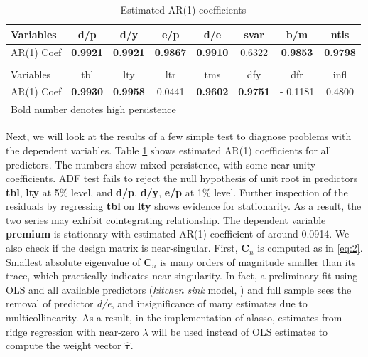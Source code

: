 \documentclass[12pt,a4paper]{article}
\begin{document}
\begin{table}[]\center \small
\caption{Estimated AR(1) coefficients}
\label{tab:4}
\begin{tabular}{lccccccc}
\hline
\multicolumn{1}{|l|}{Variables}  & d/p             & d/y             & e/p             & d/e             & svar   & b/m             & \multicolumn{1}{c|}{ntis}   \\ \hline
\multicolumn{1}{|l|}{AR(1) Coef} & \textbf{0.9921} & \textbf{0.9921} & \textbf{0.9867} & \textbf{0.9910} & 0.6322 & \textbf{0.9853} & \multicolumn{1}{c|}{\textbf{0.9798}} \\ \hline
\multicolumn{8}{l}{}                                                                                                                                              \\ \hline
\multicolumn{1}{|l|}{Variables}  & tbl             & lty             & ltr             & tms             & dfy    & dfr             & \multicolumn{1}{c|}{infl}   \\ \hline
\multicolumn{1}{|l|}{AR(1) Coef} & \textbf{0.9930} & \textbf{0.9958} & 0.0441          & \textbf{0.9602}          & \textbf{0.9751} & - 0.1181        & \multicolumn{1}{c|}{0.4800} \\ \hline
\multicolumn{8}{l}{Bold number denotes high persistence}                                                                                          
\end{tabular}
\end{table}

Next, we will look at the results of a few simple test to diagnose problems with the dependent variables. Table \ref{tab:4} shows estimated AR(1) coefficients for all predictors. The numbers show mixed persistence, with some near-unity coefficients. ADF test fails to reject the null hypothesis of unit root in predictors \textbf{tbl}, \textbf{lty} at 5\% level, and \textbf{d/p}, \textbf{d/y}, \textbf{e/p} at 1\% level. Further inspection of the residuals by regressing \textbf{tbl} on \textbf{lty} shows evidence for stationarity. As a result, the two series may exhibit cointegrating relationship. The dependent variable \textbf{premium} is stationary with estimated AR(1) coefficient of around 0.0914. We also check if the design matrix is near-singular. First, $ \bm{C}_n $ is computed as in \eqref{eq:2}. Smallest absolute eigenvalue of $ \bm{C}_n $ is many orders of magnitude smaller than its trace, which practically indicates near-singularity. In fact, a preliminary fit using OLS and all available predictors (\textit{kitchen sink} model, \cite{welch2008comprehensive}) and full sample sees the removal of predictor \textit{d/e}, and insignificance of many estimates due to multicollinearity. As a result, in the implementation of alasso, estimates from ridge regression with near-zero $ \lambda $ will be used instead of OLS estimates to compute the weight vector $ \hat{\bm{\tau}} $.
\end{document}

